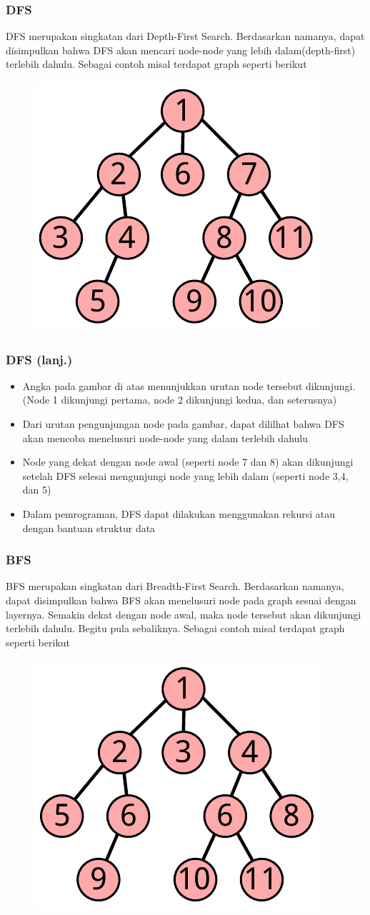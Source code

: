 \begin{frame}
\frametitle{DFS}

\alert{DFS} merupakan singkatan dari Depth-First Search. Berdasarkan namanya, dapat disimpulkan bahwa DFS akan mencari node-node yang lebih dalam(depth-first) terlebih dahulu. Sebagai contoh misal terdapat graph seperti berikut

\begin{figure}
  \centering
  \includegraphics[width=5 cm]{asset/dfs.pdf}
\end{figure}
\end{frame}

\begin{frame}
\frametitle{DFS (lanj.)}
\begin{itemize}
  \item Angka pada gambar di atas menunjukkan urutan node tersebut dikunjungi. (Node 1 dikunjungi pertama, node 2 dikunjungi kedua, dan seterusnya)
  \item Dari urutan pengunjungan node pada gambar, dapat dililhat bahwa DFS akan mencoba menelusuri node-node yang dalam terlebih dahulu
  \item Node yang dekat dengan node awal (seperti node 7 dan 8) akan dikunjungi setelah DFS selesai mengunjungi node yang lebih dalam (seperti node 3,4, dan 5)
  \item Dalam pemrograman, DFS dapat dilakukan menggunakan rekursi atau dengan bantuan struktur data 
\end{itemize}
\end{frame}

\begin{frame}
\frametitle{BFS}

\alert{BFS} merupakan singkatan dari Breadth-First Search. Berdasarkan namanya, dapat disimpulkan bahwa BFS akan menelusuri node pada graph sesuai dengan layernya. Semakin dekat dengan node awal, maka node tersebut akan dikunjungi terlebih dahulu. Begitu pula sebaliknya. Sebagai contoh misal terdapat graph seperti berikut

\begin{figure}
  \centering
  \includegraphics[width=5 cm]{asset/bfs.pdf}
\end{figure}

\end{frame}

